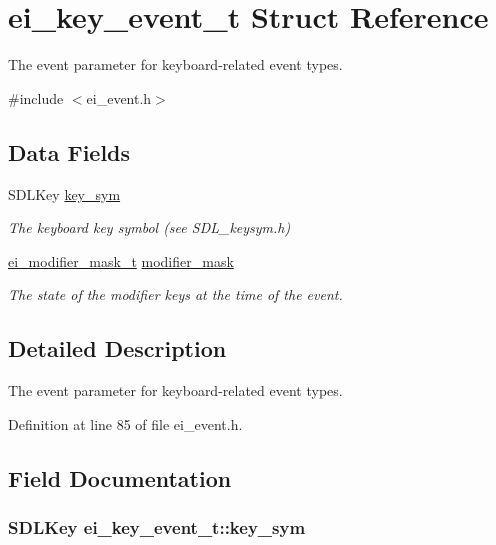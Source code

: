 \hypertarget{structei__key__event__t}{\section{ei\+\_\+key\+\_\+event\+\_\+t Struct Reference}
\label{structei__key__event__t}
}


The event parameter for keyboard-\/related event types.  




{\ttfamily \#include $<$ei\+\_\+event.\+h$>$}

\subsection*{Data Fields}
\begin{DoxyCompactItemize}
\item 
S\+D\+L\+Key \hyperlink{structei__key__event__t_a34be444e0f81bfa20e0b053779faf873}{key\+\_\+sym}
\begin{DoxyCompactList}\small\item\em The keyboard key symbol (see S\+D\+L\+\_\+keysym.\+h) \end{DoxyCompactList}\item 
\hyperlink{ei__event_8h_abcdd2ef0f39179463f17a06be9bdf949}{ei\+\_\+modifier\+\_\+mask\+\_\+t} \hyperlink{structei__key__event__t_a35e4dc6d788b9fdd4eeedf716662afab}{modifier\+\_\+mask}
\begin{DoxyCompactList}\small\item\em The state of the modifier keys at the time of the event. \end{DoxyCompactList}\end{DoxyCompactItemize}


\subsection{Detailed Description}
The event parameter for keyboard-\/related event types. 

Definition at line 85 of file ei\+\_\+event.\+h.



\subsection{Field Documentation}
\hypertarget{structei__key__event__t_a34be444e0f81bfa20e0b053779faf873}{
\subsubsection[{key\+\_\+sym}]{\setlength{\rightskip}{0pt plus 5cm}S\+D\+L\+Key ei\+\_\+key\+\_\+event\+\_\+t\+::key\+\_\+sym}}\label{structei__key__event__t_a34be444e0f81bfa20e0b053779faf873}


